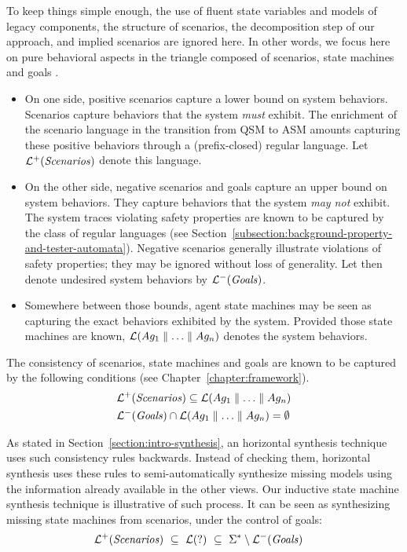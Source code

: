 To keep things simple enough, the use of fluent state variables and models of legacy components, the structure of scenarios, the decomposition step of our approach, and implied scenarios are ignored here. In other words, we focus here on pure behavioral aspects in the triangle composed of scenarios, state machines and goals \cite{Damas:2006, Uchitel:2007}.
\begin{itemize}
\item On one side, positive scenarios capture a lower bound on system behaviors. Scenarios capture behaviors that the system \emph{must} exhibit. The enrichment of the scenario language in the transition from QSM to ASM amounts capturing these positive behaviors through a (prefix-closed) regular language. Let $\mathcal{L}^+(\mbox{\emph{Scenarios}})$ denote this language. 
\item On the other side, negative scenarios and goals capture an upper bound on system behaviors. They capture behaviors that the system \emph{may not} exhibit. The system traces violating safety properties are known to be captured by the class of regular languages (see Section~\ref{subsection:background-property-and-tester-automata}). Negative scenarios generally illustrate violations of safety properties; they may be ignored without loss of generality. Let then denote undesired system behaviors by $\mathcal{L}^-(\mbox{\emph{Goals}})$.
\item Somewhere between those bounds, agent state machines may be seen as capturing the exact behaviors exhibited by the system. Provided those state machines are known, $\mathcal{L}(Ag_1 \parallel \ldots \parallel Ag_n)$ denotes the system behaviors. 
\end{itemize}

The consistency of scenarios, state machines and goals are known to be captured by the following conditions (see Chapter~\ref{chapter:framework}).
\begin{align*}
&\mathcal{L}^+(\mbox{\emph{Scenarios}}) \subseteq \mathcal{L}(Ag_1 \parallel \ldots \parallel Ag_n) \\
&\mathcal{L}^-(\mbox{\emph{Goals}}) \cap \mathcal{L}(Ag_1 \parallel \ldots \parallel Ag_n) = \emptyset
\end{align*}

As stated in Section~\ref{section:intro-synthesis}, an horizontal synthesis technique uses such consistency rules backwards. Instead of checking them, horizontal synthesis uses these rules to semi-automatically synthesize missing models using the information already available in the other views. Our inductive state machine synthesis technique is illustrative of such process. It can be seen as synthesizing missing state machines from scenarios, under the control of goals:
\begin{align*}
&\mathcal{L}^+(\mbox{\emph{Scenarios}})~\subseteq~\mathcal{L}(?)~\subseteq~\Sigma^* \setminus \mathcal{L}^-(\mbox{\emph{Goals}})
\end{align*}

